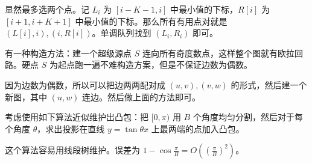 \documentclass{oisolution}
\begin{document}


显然最多选两个点。记 $L_i$ 为 $[i-K-1,i]$ 中最小值的下标，$R[i]$ 为 $[i+1,i+K+1]$ 中最小值的下标。那么所有有用点对就是 $(L[i],i),(i,R[i])$。单调队列找到 $(L_i,R_i)$ 即可。


有一种构造方法：建一个超级源点 $S$ 连向所有奇度数点，这样整个图就有欧拉回路。硬点 $S$ 为起点跑一遍不难构造方案，但是不保证边数为偶数。

因为边数为偶数，所以可以把边两两配对成 $(u,v),(v,w)$ 的形式，然后建一个新图，其中 $(u,w)$ 连边。然后做上面的方法即可。


考虑使用如下算法近似维护出凸包：把 $[0,\pi)$ 用 $B$ 个角度均匀分割，然后对于每个角度 $\theta$，求出投影在直线 $y=\tan\theta x$ 上最两端的点加入凸包。

这个算法容易用线段树维护。误差为 $\displaystyle 1-\cos\frac{\pi}{B}=O\left(\left(\frac{\pi}{B}\right)^2\right)$。
\end{document}

